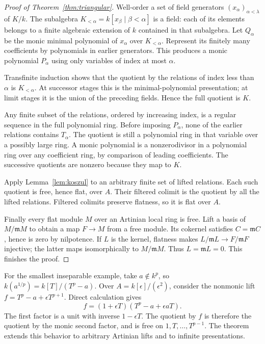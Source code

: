\documentclass[11pt]{article}
\theoremstyle{definition}\newtheorem{definition}[theorem]{Definition}
\theoremstyle{remark}\newtheorem{remark}[theorem]{Remark}
\begin{document}
\begin{proof}[Proof of Theorem~\ref{thm:triangular}]
Well-order a set of field generators $(x_\alpha)_{\alpha<\lambda}$ of $K/k$. The subalgebra $K_{<\alpha}=k[x_\beta\mid\beta<\alpha]$ is a field: each of its elements belongs to a finite algebraic extension of $k$ contained in that subalgebra. Let $Q_\alpha$ be the monic minimal polynomial of $x_\alpha$ over $K_{<\alpha}$. Represent its finitely many coefficients by polynomials in earlier generators. This produces a monic polynomial $P_\alpha$ using only variables of index at most $\alpha$.

Transfinite induction shows that the quotient by the relations of index less than $\alpha$ is $K_{<\alpha}$. At successor stages this is the minimal-polynomial presentation; at limit stages it is the union of the preceding fields. Hence the full quotient is $K$.

Any finite subset of the relations, ordered by increasing index, is a regular sequence in the full polynomial ring. Before imposing $P_\alpha$, none of the earlier relations contains $T_\alpha$. The quotient is still a polynomial ring in that variable over a possibly large ring. A monic polynomial is a nonzerodivisor in a polynomial ring over any coefficient ring, by comparison of leading coefficients. The successive quotients are nonzero because they map to $K$.

Apply Lemma~\ref{lem:koszul} to an arbitrary finite set of lifted relations. Each such quotient is free, hence flat, over $A$. Their filtered colimit is the quotient by all the lifted relations. Filtered colimits preserve flatness, so it is flat over $A$.

Finally every flat module $M$ over an Artinian local ring is free. Lift a basis of $M/\mathfrak mM$ to obtain a map $F\to M$ from a free module. Its cokernel satisfies $C=\mathfrak mC$, hence is zero by nilpotence. If $L$ is the kernel, flatness makes $L/\mathfrak mL\to F/\mathfrak mF$ injective; the latter maps isomorphically to $M/\mathfrak mM$. Thus $L=\mathfrak mL=0$. This finishes the proof.
\end{proof}

For the smallest inseparable example, take $a\notin k^p$, so $k(a^{1/p})=k[T]/(T^p-a)$. Over $A=k[\epsilon]/(\epsilon^2)$, consider the nonmonic lift $f=T^p-a+\epsilon T^{p+1}$. Direct calculation gives
\[
 f=(1+\epsilon T)(T^p-a+\epsilon aT).
\]
The first factor is a unit with inverse $1-\epsilon T$. The quotient by $f$ is therefore the quotient by the monic second factor, and is free on $1,T,\ldots,T^{p-1}$. The theorem extends this behavior to arbitrary Artinian lifts and to infinite presentations.
\end{document}

